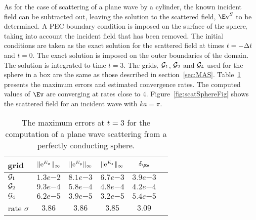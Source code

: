 As for the case of scattering of a plane wave by a cylinder, 
the known incident field can be subtracted out, leaving the solution to the
scattered field, $\Ev^S$ to be determined. 
A PEC boundary condition is imposed on the surface
of the sphere, taking into account the incident field that has been removed. 
The initial conditions are taken as the exact
solution for the scattered field at times $t=-{\Delta t}$ and $t=0$.  
The exact solution is imposed on the
outer boundaries of the domain. The solution is integrated to time $t=3$. 
% 
The grids, ${\mathcal G}_1$, ${\mathcal G}_2$ and ${\mathcal G}_4$ used 
for the sphere in a box are the same as those described in section~\ref{sec:MAS}.
% 
Table~\ref{table:mx.sibII} presents the maximum errors and estimated convergence rates.
The computed values of $\Ev$ are converging at rates close to $4$. 
Figure~\ref{fig:scatSphereFig} shows the scattered field for an incident wave with $k a =\pi$. 


\begin{table}[hbt]
\begin{center}
\begin{tabular}{|l|c|c|c|c|c|} \hline\hline 
grid  & $\|{\rm e}^{E_x}\|_\infty$  & $\|{\rm e}^{E_y}\|_\infty$ & $\|{\rm e}^{E_z}\|_\infty$ & $\delta_\Ev$\\ \hline 
${\mathcal G}_1$ &$1.3 e{-2}$ &$8.1 e{-3}$ &$6.7 e{-3}$ &$3.9 e{-3}$  \\ \hline
${\mathcal G}_2$ &$9.3 e{-4}$ &$5.8 e{-4}$ &$4.8 e{-4}$ &$4.2 e{-4}$  \\ \hline
${\mathcal G}_4$ &$6.2 e{-5}$ &$3.9 e{-5}$ &$3.2 e{-5}$ &$5.4 e{-5}$  \\ \hline
rate $\sigma$  & $3.86$ &   $3.86$ &       $3.85$ &       $3.09$  \\ \hline\hline
\end{tabular}
\caption{The maximum errors at $t=3$ for the computation of a plane wave scattering from
  a perfectly conducting sphere. 
}\label{table:mx.sibII}
\end{center}
\end{table}

